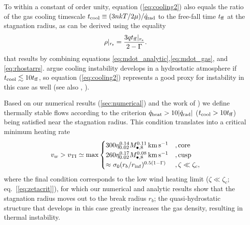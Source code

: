 \documentclass[usenatbib,fleqn]{mn2e}
\newcommand{\tff}{t_{\rm ff}}
\begin{document}
To within a constant of order unity, equation (\ref{eq:cooling2}) also
equals the ratio of the gas cooling timescale $t_{\rm cool} \equiv (3n
kT/2 \mu)/\dot{q}_{\rm rad}$ to the free-fall time $t_{\rm ff}$ at the
stagnation radius, as can be derived using the equality
\begin{align}
\rho|_{r_{\rm s}}=\frac{3 q\tff|_{r_{\rm s}}}{2-\Gamma}.
\label{eq:rhors2}
\end{align}
that results by combining equations
\eqref{eq:mdot_analytic},\eqref{eq:mdot_gas}, and
\eqref{eq:rhostarrs}.  \citet{McCourt+12} argue cooling instability
develops in a hydrostatic atmosphere if $t_{\rm cool} \lesssim 10 t_{\rm ff}$,
so equation (\ref{eq:cooling2}) represents a good proxy for
instability in this case as well (see also \citealt{Li&Bryan14a}, \citealt{Li&Bryan14b}).

Based on our numerical results (\ref{sec:numerical}) and the work of \citet{McCourt+12}) we define thermally stable flows according to the criterion $\dot{q}_{\rm heat} > 10|\dot{q}_{\rm rad}|$ ($t_{\rm
  cool} > 10t_{\rm ff}$) being satisfied near the stagnation radius.  This condition translates into a
critical minimum heating rate
\begin{align}
v_{w} > v_{\rm TI} \simeq
  {\rm max}\begin{cases}
   300 \eta_{0.02}^{0.14} M_{\bullet,8}^{0.11}\,{\rm km\,s^{-1}}  &, \text{core}\\
   260 \eta_{0.02}^{0.17} M_{\bullet,8}^{0.08}\,{\rm km\,s^{-1}}   &, \text{cusp}  \\
\approx \sigma_0(r_{b}/r_{\rm inf})^{0.5(1-\Gamma)} &, \zeta \ll \zeta_c, 
  \end{cases}
  \label{eq:cooling3}
\end{align}
where the final condition corresponds to the low wind heating limit
($\zeta \ll \zeta_c$; eq.~[\ref{eq:zetacrit}]), for which our
numerical and analytic results show that the stagnation radius moves
out to the break radius $r_b$; the quasi-hydrostatic structure that
develops in this case greatly increases the gas density, resulting in
thermal instability.
\end{document}
